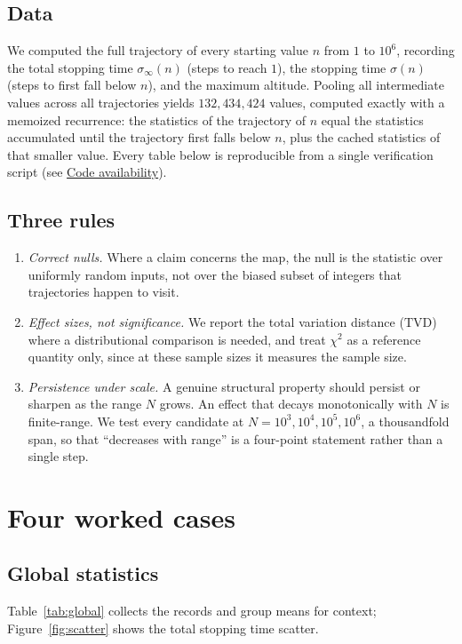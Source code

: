 \documentclass[11pt]{amsart}
\newcommand{\TVD}{\mathrm{TVD}}
\begin{document}
\subsection{Data}
We computed the full trajectory of every starting value $n$ from $1$ to $10^6$, recording the total stopping time $\sigma_\infty(n)$ (steps to reach $1$), the stopping time $\sigma(n)$ (steps to first fall below $n$), and the maximum altitude. Pooling all intermediate values across all trajectories yields $132{,}434{,}424$ values, computed exactly with a memoized recurrence: the statistics of the trajectory of $n$ equal the statistics accumulated until the trajectory first falls below $n$, plus the cached statistics of that smaller value. Every table below is reproducible from a single verification script (see \hyperref[sec:code]{Code availability}).

\subsection{Three rules}
\begin{enumerate}
\item \emph{Correct nulls.} Where a claim concerns the map, the null is the statistic over uniformly random inputs, not over the biased subset of integers that trajectories happen to visit.
\item \emph{Effect sizes, not significance.} We report the total variation distance ($\TVD$) where a distributional comparison is needed, and treat $\chi^2$ as a reference quantity only, since at these sample sizes it measures the sample size.
\item \emph{Persistence under scale.} A genuine structural property should persist or sharpen as the range $N$ grows. An effect that decays monotonically with $N$ is finite-range. We test every candidate at $N = 10^3, 10^4, 10^5, 10^6$, a thousandfold span, so that ``decreases with range'' is a four-point statement rather than a single step.
\end{enumerate}

\section{Four worked cases}\label{sec:cases}

\subsection{Global statistics}\label{sec:global}
Table~\ref{tab:global} collects the records and group means for context; Figure~\ref{fig:scatter} shows the total stopping time scatter.
\end{document}
